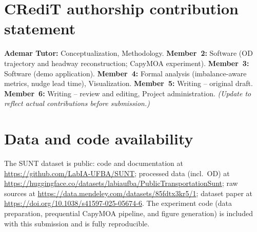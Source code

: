 \documentclass[11pt,a4paper]{article}
\begin{document}
\section*{CRediT authorship contribution statement}
\textbf{Ademar Tutor:} Conceptualization, Methodology.
\textbf{Member~2:} Software (OD trajectory and headway reconstruction; CapyMOA experiment).
\textbf{Member~3:} Software (demo application).
\textbf{Member~4:} Formal analysis (imbalance-aware metrics, nudge lead time), Visualization.
\textbf{Member~5:} Writing -- original draft.
\textbf{Member~6:} Writing -- review and editing, Project administration.
\emph{(Update to reflect actual contributions before submission.)}

\section*{Data and code availability}
The SUNT dataset is public: code and documentation at
\url{https://github.com/LabIA-UFBA/SUNT}; processed data (incl.\ OD) at
\url{https://huggingface.co/datasets/labiaufba/PublicTransportationSunt}; raw sources at
\url{https://data.mendeley.com/datasets/85fdtx3kr5/1}; dataset paper at
\url{https://doi.org/10.1038/s41597-025-05674-6}. The experiment code (data preparation,
prequential CapyMOA pipeline, and figure generation) is included with this submission and is
fully reproducible.



\end{document}
